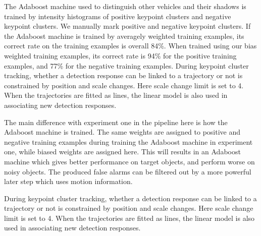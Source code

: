 The Adaboost machine used to distinguish other vehicles and their shadows is trained by intensity histograms of positive keypoint clusters and negative keypoint clusters. We manually mark  positive  and  negative keypoint clusters. If the Adaboost machine is trained by averagely weighted training examples, its correct rate on the training examples is overall 84\%. When trained using our bias weighted training examples, its correct rate is  94\% for the positive training examples, and 77\% for the negative training examples.
During keypoint cluster tracking, whether a detection response can be linked to a trajectory or not is constrained by position and scale changes. Here scale change limit is set to 4. When the trajectories are fitted as lines, the linear model is also used in associating new detection responses.

The main difference with experiment one in the pipeline here is how the Adaboost machine is trained. The same weights are assigned to positive and negative training examples during training the Adaboost machine in experiment one, while biased weights are assigned here. This will results in an Adaboost machine which gives better performance on target objects, and perform worse on noisy objects. The produced false alarms can be  filtered out by a more powerful later step which uses motion information.

During keypoint cluster tracking, whether a detection response can be linked to a trajectory or not is constrained by position and scale changes. Here scale change limit is set to 4. When the trajectories are fitted as lines, the linear model is also used in associating new detection responses.



